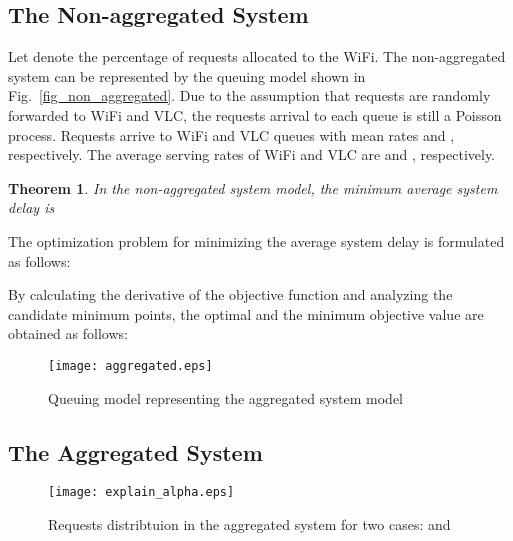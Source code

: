 \documentclass[10pt,journal]{IEEEtran}
\newtheorem{theorem}{Theorem}
\begin{document}
\subsection{The Non-aggregated System}
Let  denote the percentage of requests allocated to the WiFi. The non-aggregated system can be represented by the queuing model shown in Fig.~\ref{fig_non_aggregated}. Due to the assumption that requests are randomly forwarded to WiFi and VLC, the requests arrival to each queue is still a Poisson process. Requests arrive to WiFi and VLC queues with mean rates  and , respectively. The average serving rates of WiFi and VLC are  and , respectively.

\begin{theorem}
In the non-aggregated system model, the minimum average system delay is
\vspace{-0.1cm}

\end{theorem}

\begin{IEEEproof}
The optimization problem for minimizing the average system delay is formulated as follows:
\vspace{-0.1cm}


By calculating the derivative of the objective function and analyzing the candidate minimum points, the optimal  and the minimum objective value are obtained as follows:

\end{IEEEproof}













\begin{figure}
\centering
 \texttt{[image: aggregated.eps]}
\caption{Queuing model representing the aggregated system model}
\label{fig_aggregated}
\end{figure}

\subsection{The Aggregated System}

\begin{figure}
\begin{center}
    \texttt{[image: explain\_alpha.eps]}
  \end{center}
\caption{Requests distribtuion in the aggregated system for two cases:  and }
\label{fig_explain_alpha}
\end{figure}
\end{document}
